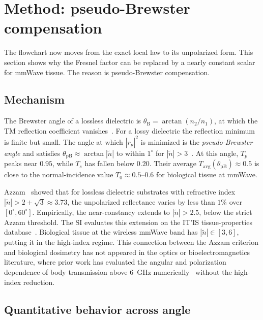 \documentclass[journal,twocolumn,10pt]{IEEEtran}
\theoremstyle{plain}
\newcommand{\Tavg}{T_{\mathrm{avg}}}
\newcommand{\ntilde}{\tilde{n}}
\begin{document}
\section{Method: pseudo-Brewster compensation}\label{sec:pB}

The flowchart now moves from the exact local law to its unpolarized
form. This section shows why the Fresnel factor can be replaced by a
nearly constant scalar for mmWave tissue. The reason is
pseudo-Brewster compensation.

\subsection{Mechanism}\label{subsec:pB-mech}

The Brewster angle of a lossless dielectric is $\theta_{\mathrm{B}} =
\arctan(n_2/n_1)$, at which the TM reflection coefficient
vanishes~\cite{BornWolf1999}. For a lossy dielectric the reflection
minimum is finite but small. The angle at which $|r_p|^2$ is
minimized is the \textit{pseudo-Brewster angle} and satisfies
$\theta_{\mathrm{pB}} \approx \arctan|\ntilde|$ to within $1^\circ$ for
$|\ntilde| > 3$~\cite{Potter1970,Ohman1977}. At this angle, $T_p$
peaks near $0.95$, while $T_s$ has fallen below $0.20$. Their
average $\Tavg(\theta_{\mathrm{pB}}) \approx 0.5$ is close to the
normal-incidence value $T_0 \approx 0.5$--$0.6$ for biological
tissue at mmWave.

Azzam~\cite{Azzam2015} showed that for lossless dielectric substrates
with refractive index $|\ntilde| > 2 + \sqrt{3} \approx 3.73$, the
unpolarized reflectance varies by less than $1\%$ over $[0^\circ,
60^\circ]$. Empirically, the near-constancy extends to $|\ntilde| > 2.5$,
below the strict Azzam threshold. The SI evaluates this extension on
the IT'IS tissue-properties database~\cite{ITISv5,Gabriel1996}. Biological tissue at the wireless mmWave
band has $|\ntilde| \in [3, 6]$, putting it in the high-index
regime. This connection between the Azzam criterion and biological dosimetry
has not appeared in the optics or bioelectromagnetics literature,
where prior work has evaluated the angular and polarization
dependence of body transmission above $6$~GHz
numerically~\cite{Samaras2019} without the high-index reduction.

\subsection{Quantitative behavior across angle}\label{subsec:pB-quant}
\end{document}
